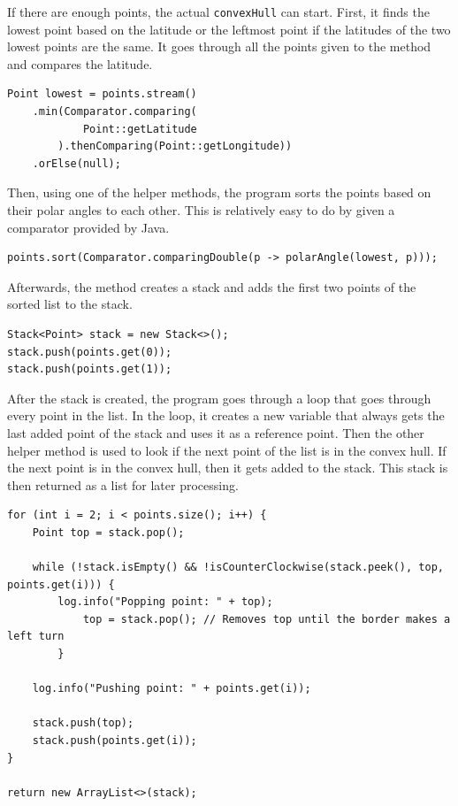     If there are enough points, the actual \texttt{convexHull} can start. First, it finds the lowest point based on the latitude or the leftmost point if the latitudes of the two lowest points are the same. It goes through all the points given to the method and compares the latitude.
    \begin{verbatim}
Point lowest = points.stream()
    .min(Comparator.comparing(
            Point::getLatitude
        ).thenComparing(Point::getLongitude))
    .orElse(null);
    \end{verbatim}

    Then, using one of the helper methods, the program sorts the points based on their polar angles to each other. This is relatively easy to do by given a comparator provided by Java.

    \begin{verbatim}
points.sort(Comparator.comparingDouble(p -> polarAngle(lowest, p)));
    \end{verbatim}

    Afterwards, the method creates a stack and adds the first two points of the sorted list to the stack. 
    \begin{verbatim}
Stack<Point> stack = new Stack<>();
stack.push(points.get(0));
stack.push(points.get(1));
    \end{verbatim}

    After the stack is created, the program goes through a loop that goes through every point in the list. In the loop, it creates a new variable that always gets the last added point of the stack and uses it as a reference point. Then the other helper method is used to look if the next point of the list is in the convex hull. If the next point is in the convex hull, then it gets added to the stack. This stack is then returned as a list for later processing.
    \begin{verbatim}
for (int i = 2; i < points.size(); i++) {
    Point top = stack.pop();

    while (!stack.isEmpty() && !isCounterClockwise(stack.peek(), top, points.get(i))) {
        log.info("Popping point: " + top);
            top = stack.pop(); // Removes top until the border makes a left turn
        }

    log.info("Pushing point: " + points.get(i));

    stack.push(top);
    stack.push(points.get(i));
}

return new ArrayList<>(stack);
    \end{verbatim}

